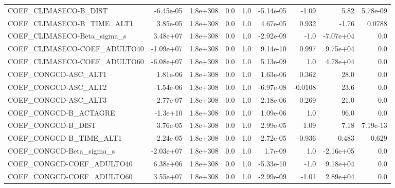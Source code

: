 \begin{tabular}{lrrrrrrrr}
COEF\_CLIMASECO-B\_DIST             &   -6.45e-05 &     1.8e+308 &     0.0 &      1.0 &  -5.14e-05 &       -1.09 &         5.82 &      5.78e-09 \\
COEF\_CLIMASECO-B\_TIME\_ALT1        &    3.85e-05 &     1.8e+308 &     0.0 &      1.0 &   4.67e-05 &       0.932 &        -1.76 &        0.0788 \\
COEF\_CLIMASECO-Beta\_sigma\_s       &    3.48e+07 &     1.8e+308 &     0.0 &      1.0 &  -2.92e-09 &        -1.0 &    -7.07e+04 &           0.0 \\
COEF\_CLIMASECO-COEF\_ADULTO40      &   -1.09e+07 &     1.8e+308 &     0.0 &      1.0 &   9.14e-10 &       0.997 &     9.75e+04 &           0.0 \\
COEF\_CLIMASECO-COEF\_ADULTO60      &   -6.08e+07 &     1.8e+308 &     0.0 &      1.0 &   5.13e-09 &         1.0 &     4.78e+04 &           0.0 \\
COEF\_CONGCD-ASC\_ALT1              &    1.81e-06 &     1.8e+308 &     0.0 &      1.0 &   1.63e-06 &       0.362 &         28.0 &           0.0 \\
COEF\_CONGCD-ASC\_ALT2              &   -1.54e-06 &     1.8e+308 &     0.0 &      1.0 &  -6.97e-08 &     -0.0108 &         23.6 &           0.0 \\
COEF\_CONGCD-ASC\_ALT3              &    2.77e-07 &     1.8e+308 &     0.0 &      1.0 &   2.18e-06 &       0.269 &         21.0 &           0.0 \\
COEF\_CONGCD-B\_ACTAGRE             &    -1.3e+10 &     1.8e+308 &     0.0 &      1.0 &   1.09e-06 &         1.0 &         96.0 &           0.0 \\
COEF\_CONGCD-B\_DIST                &    3.76e-05 &     1.8e+308 &     0.0 &      1.0 &   2.99e-05 &        1.09 &         7.18 &      7.19e-13 \\
COEF\_CONGCD-B\_TIME\_ALT1           &   -2.24e-05 &     1.8e+308 &     0.0 &      1.0 &  -2.72e-05 &      -0.936 &       -0.483 &         0.629 \\
COEF\_CONGCD-Beta\_sigma\_s          &   -2.03e+07 &     1.8e+308 &     0.0 &      1.0 &    1.7e-09 &         1.0 &    -2.16e+05 &           0.0 \\
COEF\_CONGCD-COEF\_ADULTO40         &    6.38e+06 &     1.8e+308 &     0.0 &      1.0 &  -5.33e-10 &        -1.0 &     9.18e+04 &           0.0 \\
COEF\_CONGCD-COEF\_ADULTO60         &    3.55e+07 &     1.8e+308 &     0.0 &      1.0 &  -2.99e-09 &       -1.01 &     2.89e+04 &           0.0 \\

\end{tabular}
